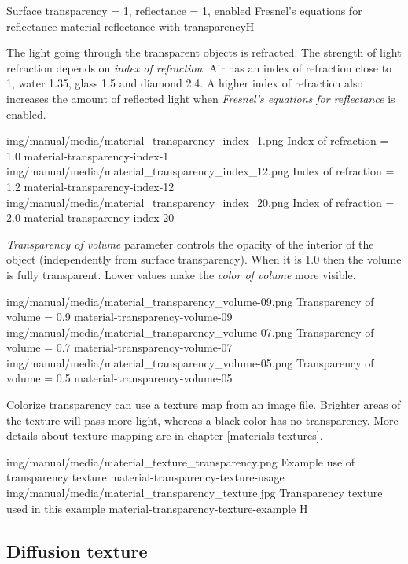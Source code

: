 {Surface transparency = 1, reflectance = 1, enabled Fresnel's equations for reflectance}
{material-reflectance-with-transparency}{H}

The light going through the transparent objects is refracted. The strength of light refraction depends on \emph{index of refraction}. Air has an index of refraction close to 1, water 1.35, glass 1.5 and diamond 2.4. A higher index of refraction also increases the amount of reflected light when \emph{Fresnel's equations for reflectance} is enabled.

\threeImagesWithTwoCaptionsFullWidth
{img/manual/media/material_transparency_index_1.png}
{Index of refraction = 1.0}
{material-transparency-index-1}
{img/manual/media/material_transparency_index_12.png}
{Index of refraction = 1.2}
{material-transparency-index-12}
{img/manual/media/material_transparency_index_20.png}
{Index of refraction = 2.0}
{material-transparency-index-20}

\emph{Transparency of volume} parameter controls the opacity of the interior of the object (independently from surface transparency). When it is 1.0 then the volume is fully transparent. Lower values make  the \emph{color of volume} more visible.

\threeImagesWithTwoCaptionsFullWidth
{img/manual/media/material_transparency_volume-09.png}
{Transparency of volume = 0.9}
{material-transparency-volume-09}
{img/manual/media/material_transparency_volume-07.png}
{Transparency of volume = 0.7}
{material-transparency-volume-07}
{img/manual/media/material_transparency_volume-05.png}
{Transparency of volume = 0.5}
{material-transparency-volume-05}

Colorize transparency can use a texture map from an image file. Brighter areas of the texture will pass more light, whereas a black color has no transparency. More details about texture mapping are in chapter \ref{materials-textures}.

\twoImagesWithTwoCaptionsFullWidth
{img/manual/media/material_texture_transparency.png}
{Example use of transparency texture}
{material-transparency-texture-usage}
{img/manual/media/material_transparency_texture.jpg}
{Transparency texture used in this example}
{material-transparency-texture-example}
{H}

\subsection{Diffusion texture}\label{materials-diffusion-texture}

